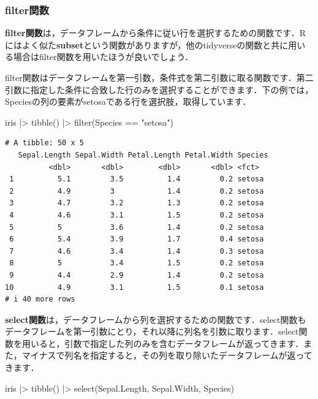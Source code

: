 \documentclass[
  letterpaper,
  DIV=11,
  numbers=noendperiod]{scrreprt}
\newenvironment{Shaded}{\begin{snugshade}}{\end{snugshade}}
\newcommand{\FunctionTok}[1]{\textcolor[rgb]{0.28,0.35,0.67}{#1}}
\newcommand{\NormalTok}[1]{\textcolor[rgb]{0.00,0.23,0.31}{#1}}
\newcommand{\SpecialCharTok}[1]{\textcolor[rgb]{0.37,0.37,0.37}{#1}}
\newcommand{\StringTok}[1]{\textcolor[rgb]{0.13,0.47,0.30}{#1}}
\begin{document}
\hypertarget{filterux95a2ux6570}{%
\subsubsection{filter関数}\label{filterux95a2ux6570}}

\textbf{filter関数}は，データフレームから条件に従い行を選択するための関数です．Rにはよく似た\textbf{subset}という関数がありますが，他のtidyverseの関数と共に用いる場合はfilter関数を用いたほうが良いでしょう．

filter関数はデータフレームを第一引数，条件式を第二引数に取る関数です．第二引数に指定した条件に合致した行のみを選択することができます．下の例では，Speciesの列の要素がsetosaである行を選択肢，取得しています．

\begin{Shaded}
\begin{Highlighting}[]
\NormalTok{iris }\SpecialCharTok{|\textgreater{}} \FunctionTok{tibble}\NormalTok{() }\SpecialCharTok{|\textgreater{}} \FunctionTok{filter}\NormalTok{(Species }\SpecialCharTok{==} \StringTok{"setosa"}\NormalTok{)}
\end{Highlighting}
\end{Shaded}

\begin{verbatim}
# A tibble: 50 x 5
   Sepal.Length Sepal.Width Petal.Length Petal.Width Species
          <dbl>       <dbl>        <dbl>       <dbl> <fct>  
 1          5.1         3.5          1.4         0.2 setosa 
 2          4.9         3            1.4         0.2 setosa 
 3          4.7         3.2          1.3         0.2 setosa 
 4          4.6         3.1          1.5         0.2 setosa 
 5          5           3.6          1.4         0.2 setosa 
 6          5.4         3.9          1.7         0.4 setosa 
 7          4.6         3.4          1.4         0.3 setosa 
 8          5           3.4          1.5         0.2 setosa 
 9          4.4         2.9          1.4         0.2 setosa 
10          4.9         3.1          1.5         0.1 setosa 
# i 40 more rows
\end{verbatim}

\textbf{select関数}は，データフレームから列を選択するための関数です．select関数もデータフレームを第一引数にとり，それ以降に列名を引数に取ります．select関数を用いると，引数で指定した列のみを含むデータフレームが返ってきます．また，マイナスで列名を指定すると，その列を取り除いたデータフレームが返ってきます．

\begin{Shaded}
\begin{Highlighting}[]
\NormalTok{iris }\SpecialCharTok{|\textgreater{}} \FunctionTok{tibble}\NormalTok{() }\SpecialCharTok{|\textgreater{}} \FunctionTok{select}\NormalTok{(Sepal.Length, Sepal.Width, Species)}
\end{Highlighting}
\end{Shaded}
\end{document}
